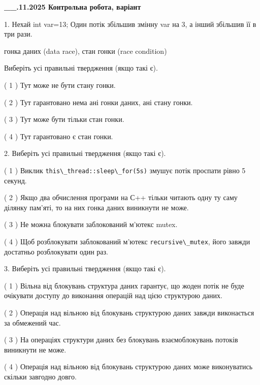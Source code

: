 \documentclass[12pt, ukrainian]{article}
\def\code#1{\Verb!#1!}
\begin{document}
\newpage
\begin {large}

\textbf{\_\_.11.2025 Контрольна робота, варіант  }\par


{
1. Нехай int var=13; Один потік збільшив змінну var на 3, а інший збільшив її в три рази.

гонка даних (data race), стан гонки (race condition)

Виберіть усі правильні твердження (якщо такі є).\par
\vspace{2mm}
( 1 ) Тут може не бути стану гонки.%

( 2 ) Тут гарантовано нема ані гонки даних, ані стану гонки.%

( 3 ) Тут може бути тільки стан гонки.%

( 4 ) Тут гарантовано є стан гонки.%


2. Виберіть усі правильні твердження (якщо такі є).\par
\vspace{2mm}

( 1 ) Виклик \code{this\_thread::sleep\_for(5s)} змушує потік проспати рівно 5 секунд.%

( 2 ) Якщо два обчислення програми на С++ тільки читають одну ту саму ділянку пам'яті, то на них гонка даних  виникнути не може.%

( 3 ) Не можна блокувати заблокований м’ютекс mutex.%

( 4 ) Щоб розблокувати заблокований м’ютекс \code{recursive\_mutex}, його завжди достатньо розблокувати один раз.%


3. Виберіть усі правильні твердження (якщо такі є).\par
\vspace{2mm}

( 1 ) Вільна від блокувань структура даних гарантує, що жоден потік не буде очікувати доступу до виконання операцій над цією структурою даних.%

( 2 ) Операція над вільною від блокувань структурою даних завжди виконається за обмежений час.%

( 3 ) На операціях структури даних без блокувань взаємоблокувань потоків виникнути не може.%

( 4 ) Операція над вільною від блокувань структурою даних може виконуватись скільки завгодно довго.%


}
\end{large}
\end{document}
